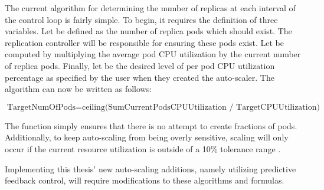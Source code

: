 The current algorithm for determining the number of replicas at each interval
of the control loop is fairly simple.
To begin, it requires the definition of
three variables. Let  be defined as the number of
replica pods which should exist. The replication controller will be responsible
for ensuring these pods exist. Let  be
computed by multiplying the average pod CPU utilization by the current number of
replica pods. Finally, let  be the desired level of
per pod CPU utilization percentage as specified by the user when they created
the auto-scaler. The algorithm can now be written as follows:

\[ \mbox{TargetNumOfPods} = \mbox{ceiling(SumCurrentPodsCPUUtilization /
TargetCPUUtilization)} \]

The  function simply ensures that there is no attempt to create
fractions of pods. Additionally, to keep auto-scaling from being overly
sensitive, scaling will only occur if the current resource utilization is
outside of a 10\% tolerance range \cite{k8s-horizontal-pod-autoscaler-proposal}.

Implementing this thesis' new auto-scaling additions, namely utilizing
predictive feedback control, will require modifications to these algorithms and
formulas.
